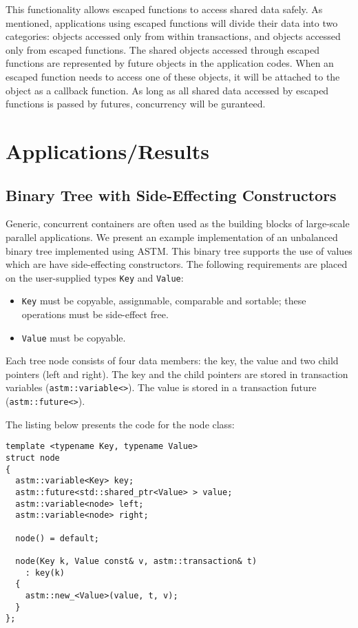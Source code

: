 \documentclass[conference]{IEEEtran}
\begin{document}
This functionality allows escaped functions to access shared data safely. As mentioned, applications using escaped functions will divide their data into two categories: objects accessed only from within transactions, and objects accessed only from escaped functions. The shared objects accessed through escaped functions are represented by future objects in the application codes. When an escaped function needs to access one of these objects, it will be attached to the object as a callback function. As long as all shared data accessed by escaped functions is passed by futures, concurrency will be guranteed.

\section{Applications/Results}

\subsection{Binary Tree with Side-Effecting Constructors}

Generic, concurrent containers are often used as the building blocks of large-scale parallel applications. We present an example implementation of an unbalanced binary tree implemented using ASTM. This binary tree  supports the use of values which are have side-effecting constructors. The following requirements are placed on the user-supplied types \lstinline$Key$ and \lstinline$Value$:

\begin{itemize}
\item \lstinline$Key$ must be copyable, assignmable, comparable and sortable; these operations must be side-effect free.
\item \lstinline$Value$ must be copyable.
\end{itemize}

Each tree node consists of four data members: the key, the value and two child pointers (left and right). The key and the child pointers are stored in transaction variables (\lstinline$astm::variable<>$). The value is stored in a transaction future (\lstinline$astm::future<>$). 

The listing below presents the code for the node class:

\begin{lstlisting}
template <typename Key, typename Value>
struct node
{
  astm::variable<Key> key;
  astm::future<std::shared_ptr<Value> > value;
  astm::variable<node> left;
  astm::variable<node> right;

  node() = default;

  node(Key k, Value const& v, astm::transaction& t)
    : key(k)
  {
	astm::new_<Value>(value, t, v);
  }
};
\end{lstlisting}
\end{document}
